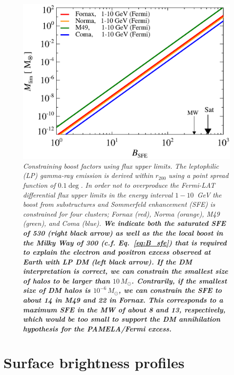\documentclass[10pt,aps,pra,reprint,amsmath,amsfonts,amssymb,showpacs,nofootinbib,floatfix]{revtex4-1}
\def\C#1{{\bf #1}}
\newcommand{\msun}{M_\odot}
\newcommand{\rvir}{r_{200}}
\begin{document}
\begin{figure}%
 \includegraphics[width=0.99\columnwidth]{figures/LP.const.diff.v13.0.1deg.1.6T.SubMass.SF700.IR2.noMW.woGal.eps}
 \caption{\it Constraining boost factors using flux upper limits. The
   leptophilic (LP) gamma-ray emission is derived within $\rvir$ using
   a point spread function of $0.1\deg$. In order not to overproduce
   the Fermi-LAT differential flux upper limits in the energy interval
   $1-10$~GeV the boost from substructures and Sommerfeld enhancement
   (SFE) is constrained for four clusters; Fornax (red), Norma
   (orange), M49 (green), and Coma (blue). \C{We indicate both the
     saturated SFE of 530 (right black arrow) as well as the the local
     boost in the Milky Way of 300 (c.f. Eq.~\ref{eq:B_sfe}) that is
     required to explain the electron and positron excess observed at
     Earth with LP DM (left black arrow). If the DM interpretation is
     correct, we can constrain the smallest size of halos to be larger
     than $10\,\msun$. Contrarily, if the smallest size of DM halos is
     $10^{-6}\,\msun$, we can constrain the SFE to about 14 in M49 and
     22 in Fornax. This corresponds to a maximum SFE in the MW of
     about 8 and 13, respectively, which would be too small to support
     the DM annihilation hypothesis for the PAMELA/Fermi excess.}}
 \label{fig:boost_const}
\end{figure}


\section{Surface brightness profiles}
\label{sect:spatial}
\end{document}
